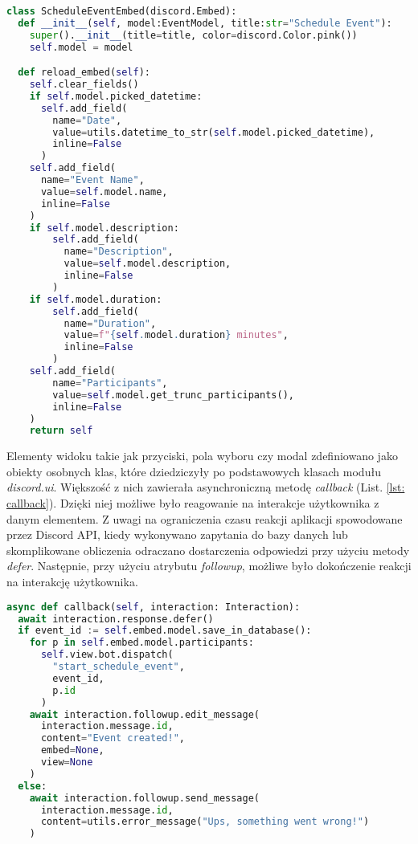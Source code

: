 \documentclass[11pt,a4paper]{article}
\begin{document}
\begin{lstlisting}[language=Python,caption={Klasa ScheduleEventEmbed},label={lst: schedule event embed}]
class ScheduleEventEmbed(discord.Embed):
  def __init__(self, model:EventModel, title:str="Schedule Event"):
    super().__init__(title=title, color=discord.Color.pink())
    self.model = model

  def reload_embed(self):
    self.clear_fields()
    if self.model.picked_datetime:
      self.add_field(
        name="Date",
        value=utils.datetime_to_str(self.model.picked_datetime), 
        inline=False
      )
    self.add_field(
      name="Event Name",
      value=self.model.name, 
      inline=False
    )
    if self.model.description:
        self.add_field(
          name="Description",
          value=self.model.description, 
          inline=False
        )
    if self.model.duration:
        self.add_field(
          name="Duration",
          value=f"{self.model.duration} minutes", 
          inline=False
        )
    self.add_field(
        name="Participants", 
        value=self.model.get_trunc_participants(), 
        inline=False
    )
    return self

\end{lstlisting}

Elementy widoku takie jak przyciski, pola wyboru czy modal zdefiniowano jako obiekty osobnych klas, które dziedziczyły po podstawowych klasach modułu \textit{discord.ui}. Większość z nich zawierała asynchroniczną metodę \textit{callback} (List. \ref{lst: callback}). Dzięki niej możliwe było reagowanie na interakcje użytkownika z danym elementem. Z uwagi na ograniczenia czasu reakcji aplikacji spowodowane przez Discord API, kiedy wykonywano zapytania do bazy danych lub skomplikowane obliczenia odraczano dostarczenia odpowiedzi przy użyciu metody \textit{defer}. Następnie, przy użyciu atrybutu \textit{followup}, możliwe było dokończenie reakcji na interakcję użytkownika.

\begin{lstlisting}[language=Python,caption={Asynchorniczna funkcja "callback" klasy "SaveButton"},label={lst: callback}]
async def callback(self, interaction: Interaction):
  await interaction.response.defer()
  if event_id := self.embed.model.save_in_database():
    for p in self.embed.model.participants:
      self.view.bot.dispatch(
        "start_schedule_event",
        event_id,
        p.id
      )
    await interaction.followup.edit_message(
      interaction.message.id, 
      content="Event created!", 
      embed=None, 
      view=None
    )
  else:
    await interaction.followup.send_message(
      interaction.message.id, 
      content=utils.error_message("Ups, something went wrong!")
    )
\end{lstlisting}
\end{document}
